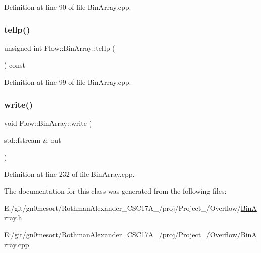 Definition at line 90 of file Bin\+Array.\+cpp.

\hypertarget{class_flow_1_1_bin_array_a3ca3149690c2c047feb34a68a96e85ab}{}\label{class_flow_1_1_bin_array_a3ca3149690c2c047feb34a68a96e85ab} 
\subsubsection{\texorpdfstring{tellp()}{tellp()}}
{\footnotesize\ttfamily unsigned int Flow\+::\+Bin\+Array\+::tellp (\begin{DoxyParamCaption}{ }\end{DoxyParamCaption}) const}



Definition at line 99 of file Bin\+Array.\+cpp.

\hypertarget{class_flow_1_1_bin_array_a287fe19d7806d46445e7454fbf384317}{}\label{class_flow_1_1_bin_array_a287fe19d7806d46445e7454fbf384317} 
\subsubsection{\texorpdfstring{write()}{write()}}
{\footnotesize\ttfamily void Flow\+::\+Bin\+Array\+::write (\begin{DoxyParamCaption}\item[{std\+::fstream \&}]{out }\end{DoxyParamCaption})}



Definition at line 232 of file Bin\+Array.\+cpp.



The documentation for this class was generated from the following files\+:\begin{DoxyCompactItemize}
\item 
E\+:/git/gn0mesort/\+Rothman\+Alexander\+\_\+\+C\+S\+C17\+A\+\_/proj/\+Project\+\_/\+Overflow/\hyperlink{_bin_array_8h}{Bin\+Array.\+h}\item 
E\+:/git/gn0mesort/\+Rothman\+Alexander\+\_\+\+C\+S\+C17\+A\+\_/proj/\+Project\+\_/\+Overflow/\hyperlink{_bin_array_8cpp}{Bin\+Array.\+cpp}\end{DoxyCompactItemize}
